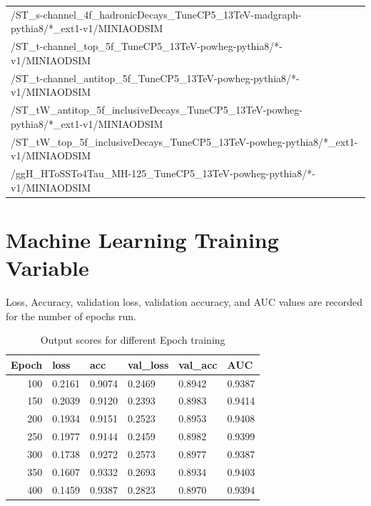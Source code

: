 \begin{table}[htb]
\begin{center}
\begin{tabular}{l}
      /ST\_s-channel\_4f\_hadronicDecays\_TuneCP5\_13TeV-madgraph-pythia8/*\_ext1-v1/MINIAODSIM \\
      /ST\_t-channel\_top\_5f\_TuneCP5\_13TeV-powheg-pythia8/*-v1/MINIAODSIM \\
      /ST\_t-channel\_antitop\_5f\_TuneCP5\_13TeV-powheg-pythia8/*-v1/MINIAODSIM \\
      /ST\_tW\_antitop\_5f\_inclusiveDecays\_TuneCP5\_13TeV-powheg-pythia8/*\_ext1-v1/MINIAODSIM \\
      /ST\_tW\_top\_5f\_inclusiveDecays\_TuneCP5\_13TeV-powheg-pythia8/*\_ext1-v1/MINIAODSIM \\
      \hline
      /ggH\_HToSSTo4Tau\_MH-125\_TuneCP5\_13TeV-powheg-pythia8/*-v1/MINIAODSIM\\
      \hline
    \end{tabular}
    \label{tab:18samplesummary}
  \end{center}
\end{table}

\chapter{Machine Learning Training Variable}\label{sec:train}

Loss, Accuracy, validation loss, validation accuracy, and AUC values are recorded for the number of epochs run.

\begin{table}[htb]
\caption{Output scores for different Epoch training}
\begin{center}
\begin{tabular}{r|l|l|l|l|l}\hline
Epoch &  loss & acc &  val\_loss & val\_acc & AUC\\
\hline
100& 0.2161 & 0.9074 & 0.2469 & 0.8942 & 0.9387\\
150& 0.2039 & 0.9120 & 0.2393 & 0.8983 & 0.9414\\
200& 0.1934 & 0.9151 & 0.2523 & 0.8953 & 0.9408\\
250& 0.1977 & 0.9144 & 0.2459 & 0.8982 & 0.9399\\
300& 0.1738 & 0.9272 & 0.2573 & 0.8977 & 0.9387\\
350& 0.1607 & 0.9332 & 0.2693 & 0.8934 & 0.9403\\
400& 0.1459 & 0.9387 & 0.2823 & 0.8970 & 0.9394\\
\hline
\end{tabular}
\label{tab:Epoch Training}
\end{center}
\end{table}

